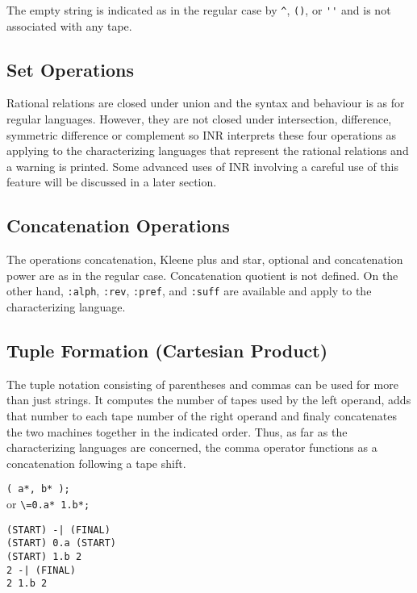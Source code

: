 The empty string is indicated as in the regular case by \verb#^#,
\verb#()#, or \verb#''# and is not associated with any tape.

\subsection{Set Operations}
Rational relations are closed under union and the syntax and behaviour is
as for regular languages.
However, they are not closed under intersection, difference,
symmetric difference or complement so INR interprets these four operations
as applying to the characterizing languages that represent the rational
relations and a warning is printed.
Some advanced uses of INR involving a careful use of this feature will be
discussed in a later section.

\subsection{Concatenation Operations}
The operations concatenation, Kleene plus and star, optional and concatenation
power are as in the regular case.
Concatenation quotient is not defined.
On the other hand, \verb#:alph#, \verb#:rev#, \verb#:pref#, and
\verb#:suff# are available and apply to the characterizing language.

\subsection{Tuple Formation (Cartesian Product)}
The tuple notation consisting of parentheses and commas can be used for
more than just strings.
It computes the number of tapes used by the left operand, adds that number
to each tape number of the right operand and finaly concatenates the two
machines together in the indicated order.
Thus, as far as the characterizing languages are concerned, the comma
operator functions as a concatenation following a tape shift.
\begin{center}\begin{minipage}[t]{3in}\begin{minipage}[t]{3in}\begin{tabbing}
\qquad \= \verb#( a*, b* );#\\
or \> \verb#\=0.a* 1.b*;#
\end{tabbing}\end{minipage}\end{minipage}
\begin{minipage}[t]{1.6in}\begin{verbatim}
(START) -| (FINAL)
(START) 0.a (START)
(START) 1.b 2
2 -| (FINAL)
2 1.b 2
\end{verbatim}\end{minipage}\end{center}

